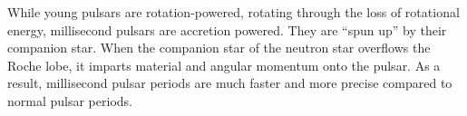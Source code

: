 While young pulsars are rotation-powered, rotating
through the loss of rotational energy, millisecond
pulsars are accretion powered.  They are ``spun up''
by their companion star.
When the companion star of the neutron star overflows
the Roche lobe, it imparts material and angular momentum
onto the pulsar.  As a result, millisecond pulsar
periods are much faster and more 
precise compared to normal pulsar periods.




